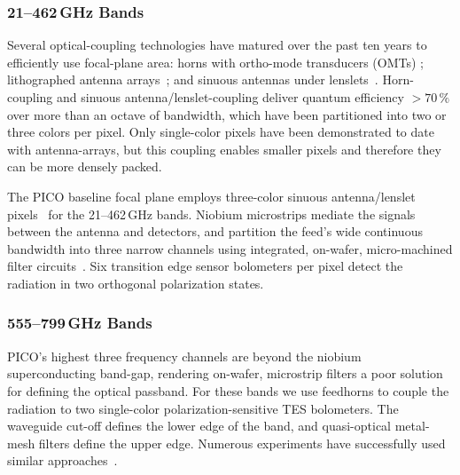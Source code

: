\subsubsection{21--462\,GHz Bands}
\label{sec:low_freq_det} %

Several optical-coupling technologies have matured over the past ten years to efficiently use focal-plane area: horns with ortho-mode transducers (OMTs) \citep{Duff2016}; lithographed antenna arrays~\citep{BICEP2015}; and sinuous antennas under lenslets~\citep{Edwards2012}. Horn-coupling and sinuous antenna/lenslet-coupling deliver quantum efficiency $>70\,\%$ over more than an octave of bandwidth, which have been partitioned into two or three colors per pixel.  
Only single-color pixels have been demonstrated to date with antenna-arrays, but this coupling enables smaller pixels and therefore they can be more densely packed.


The PICO baseline focal plane employs three-color sinuous antenna/lenslet pixels~\citep{Suzuki2014} for the 21--462\,GHz bands. Niobium microstrips mediate the signals between the antenna and detectors, and partition the feed's wide continuous bandwidth into three narrow channels using integrated, on-wafer, micro-machined filter circuits~\citep{OBrient2013}. Six transition edge sensor bolometers per pixel detect the radiation in two orthogonal polarization states. %

\subsubsection{555--799\,GHz Bands}
\label{sec:high_freq_det} %
%

PICO's highest three frequency channels are beyond the niobium superconducting band-gap, rendering on-wafer, microstrip filters a poor solution for defining the optical passband. For these bands we use feedhorns to couple the radiation to two single-color polarization-sensitive TES bolometers. %
The waveguide cut-off defines the lower edge of the band, and quasi-optical metal-mesh filters define the upper edge. Numerous experiments have successfully used similar approaches~\citep{Shirokoff2011,Bleem2012,Turner2001}. 


